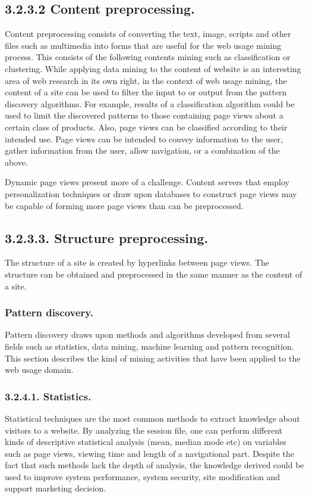 \documentclass{article}
\begin{document}
\subsection*{\small{3.2.3.2 Content preprocessing.}}
Content preprocessing consists of converting the text, image, scripts and other files such as multimedia into forms that are useful for the web usage mining process. This consists of the following contents mining such as classification or clustering. While applying data mining to the content of website is an interesting area of web research in its own right, in the context of web usage mining, the content of a site can be used to filter the input to or output from the pattern discovery algorithms. For example, results of a classification algorithm could be used to limit the discovered patterns to those containing page views about a certain class of products. Also, page views can be classified according to their intended use. Page views can be intended to convey information to the user, gather information from the user, allow navigation, or a combination of the above. 

Dynamic page views present more of a challenge. Content servers that employ personalization techniques or draw upon databases to construct page views may be capable of forming more page views than can be preprocessed.
\subsection*{\small{3.2.3.3. Structure preprocessing.}}
The structure of a site is created by hyperlinks between page views. The structure can be obtained and preprocessed in the same manner as the content of a site. 
\subsubsection{  Pattern discovery.}
Pattern discovery draws upon methods and algorithms developed from several fields such as statistics, data mining, machine learning and pattern recognition. This section describes the kind of mining activities that have been applied to the web usage domain.
\subsubsection*{3.2.4.1. Statistics.}
Statistical techniques are the most common methods to extract knowledge about visitors to a website. By analyzing the session file, one can perform different kinds of descriptive statistical analysis (mean, median mode etc) on variables such as page views, viewing time and length of a navigational part. Despite the fact that such methods lack the depth of analysis, the knowledge derived could be used to improve system performance, system security, site modification and support marketing decision.
\end{document}

